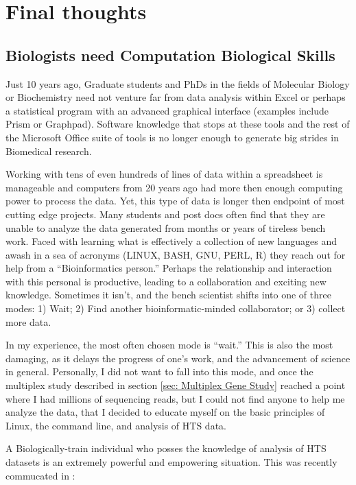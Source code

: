 {{\section{Final thoughts}

  \subsection{Biologists need Computation Biological Skills}\label{subsec: Biologists need Comp Skills}

    Just 10 years ago,  Graduate students and PhDs in the fields of Molecular Biology or Biochemistry need not venture far from data analysis within Excel or perhaps a statistical program with an advanced graphical interface (examples include Prism or Graphpad). Software knowledge that stops at these tools and the rest of the Microsoft Office suite of tools is no longer enough to generate big strides in Biomedical research.

    Working with tens of even hundreds of lines of data within a spreadsheet is manageable and computers from 20 years ago had more then enough computing power to process the data. Yet, this type of data is longer then endpoint of most cutting edge projects. Many students and post docs often find that they are unable to analyze the data generated from months or years of tireless bench work. Faced with learning what is effectively a collection of new languages and awash in a sea of acronyms (LINUX, BASH, GNU, PERL, R) they reach out for help from a ``Bioinformatics person.'' Perhaps the relationship and interaction with this personal is productive, leading to a collaboration and exciting new knowledge. Sometimes it isn't, and the bench scientist shifts into one of three modes: 1) Wait; 2) Find another bioinformatic-minded collaborator; or 3) collect more data.

    In my experience, the most often chosen mode is ``wait.'' This is also the most damaging, as it delays the progress of one's work, and the advancement of science in general. Personally, I did not want to fall into this mode, and once the multiplex study described in section \ref{sec: Multiplex Gene Study} reached a point where I had millions of sequencing reads, but I could not find anyone to help me analyze the data, that I decided to educate myself on the basic principles of Linux, the command line, and analysis of HTS data.

    A Biologically-train individual who posses the knowledge of analysis of HTS datasets is an extremely powerful and empowering situation. This was recently commucated in \citet{Plocik2013}:

}}
